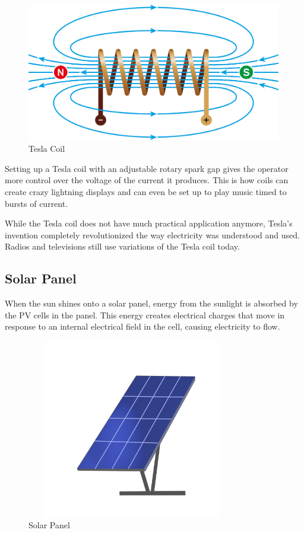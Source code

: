 	\begin{figure}[H]
	\centering
	\includegraphics[width=11.14cm,height=6.05cm]{./images/image6.png}
        \caption{Tesla Coil}

	\end{figure}
	
	
	\vspace{1\baselineskip}
	
	
	
	\vspace{1\baselineskip}
	Setting up a Tesla coil with an adjustable rotary spark gap gives the operator more control over the voltage of the current it produces. This is how coils can create crazy lightning displays and can even be set up to play music timed to bursts of current.
	
	While the Tesla coil does not have much practical application anymore, Tesla’s invention completely revolutionized the way electricity was understood and used. Radios and televisions still use variations of the Tesla coil today.
	
	
	\newpage


	\subsection{Solar Panel} When the sun shines onto a solar panel, energy from the sunlight is absorbed by the PV cells in the panel. This energy creates electrical charges that move in response to an internal electrical field in the cell, causing electricity to flow.


	
	\begin{figure}[H]
	\centering
	\includegraphics[width=9.17cm,height=7.83cm]{./images/image7.png}
	\caption{Solar Panel}
	\label{fig: solar_panel}
	\end{figure}
	
